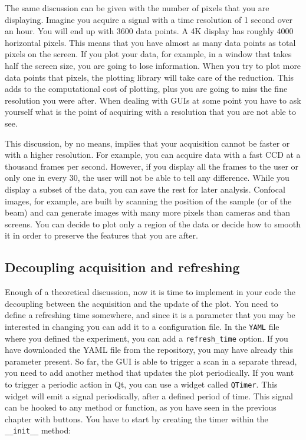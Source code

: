 The same discussion can be given with the number of pixels that you are
displaying. Imagine you acquire a signal with a time resolution of 1
second over an hour. You will end up with 3600 data points. A 4K display
has roughly 4000 horizontal pixels. This means that you have almost as
many data points as total pixels on the screen. If you plot your data,
for example, in a window that takes half the screen size, you are going
to lose information. When you try to plot more data points that pixels,
the plotting library will take care of the reduction. This adds to the
computational cost of plotting, plus you are going to miss the fine
resolution you were after. When dealing with GUIs at some point you have
to ask yourself what is the point of acquiring with a resolution that
you are not able to see.

This discussion, by no means, implies that your acquisition cannot be
faster or with a higher resolution. For example, you can acquire data
with a fast {CCD} at a thousand frames per second. However, if you display
all the frames to the user or only one in every 30, the user will not be
able to tell any difference. While you display a subset of the data, you
can save the rest for later analysis. Confocal images, for example, are
built by scanning the position of the sample (or of the beam) and can
generate images with many more pixels than cameras and than screens. You
can decide to plot only a region of the data or decide how to smooth it
in order to preserve the features that you are after.

\subsection{Decoupling acquisition and refreshing}\label{decoupling-acquisition-andrefreshing}
Enough of a theoretical discussion, now it is time to implement in your
code the decoupling between the acquisition and the update of the plot.
You need to define a refreshing time somewhere, and since it is a parameter
that you may be interested in changing you can add it to a configuration
file. In the \texttt{YAML} file where you defined the experiment, you
can add a \texttt{refresh_time} option. If you have downloaded the
{YAML} file from the repository, you may have already this parameter
present. So far, the {GUI} is able to trigger a scan in a separate
thread, you need to add another method that updates the plot
periodically. If you want to trigger a periodic action in Qt, you can
use a widget called \texttt{QTimer}. This widget will emit a signal
periodically, after a defined period of time. This signal can be hooked
to any method or function, as you have seen in the previous chapter with
buttons. You have to start by creating the timer within the
\texttt{__init__} method:

